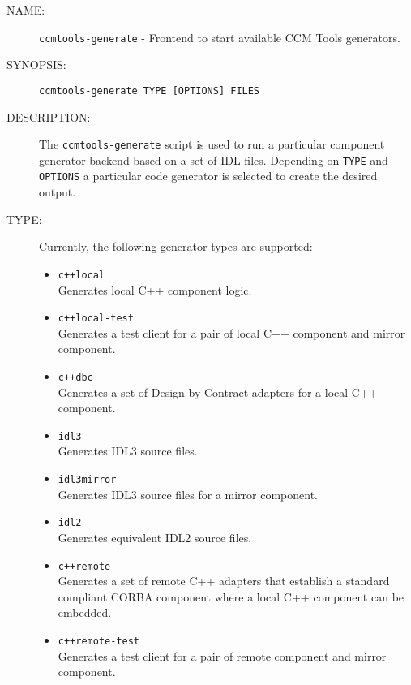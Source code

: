 \begin{description}

\item [NAME:] 
  {\tt ccmtools-generate} - Frontend to start available CCM Tools generators.

\item [SYNOPSIS:] 
  {\tt ccmtools-generate TYPE [OPTIONS] FILES}

\item [DESCRIPTION:]
The {\tt ccmtools-generate} script is used to run a particular component generator 
backend based on a set of IDL files. 
Depending on {\tt TYPE} and {\tt OPTIONS} a particular code generator is selected 
to create the desired output.

\item [TYPE:]
  Currently, the following generator types are supported:
  \begin{itemize}
  \item {\tt c++local}\\
    Generates local C++ component logic.
    
  \item {\tt c++local-test} \\
    Generates a test client for a pair of local C++ component and
    mirror component.
    
  \item {\tt c++dbc} \\
    Generates a set of Design by Contract adapters for a local
    C++ component.
    
  \item {\tt idl3 }\\
    Generates IDL3 source files.

  \item {\tt idl3mirror }\\
    Generates IDL3 source files for a mirror component.
    
  \item {\tt idl2} \\
    Generates equivalent IDL2 source files.

  \item {\tt c++remote} \\ 
    Generates a set of remote C++ adapters that establish a standard
    compliant CORBA component where a local C++ component can be embedded.

  \item {\tt c++remote-test}\\
    Generates a test client for a pair of remote component and mirror component.
  \end{itemize}
  

\end{description}
